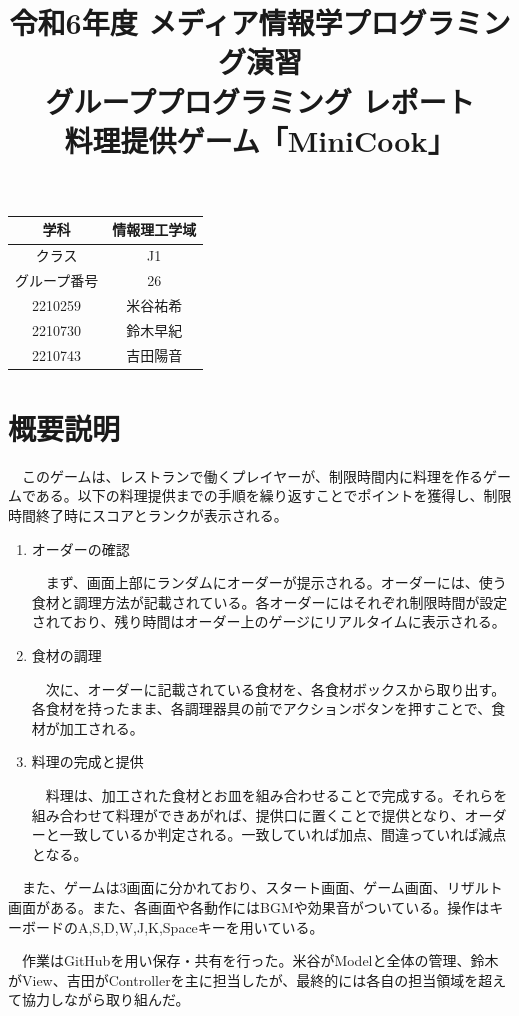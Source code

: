 \documentclass[a4j]{jarticle} %
\title{令和6年度 メディア情報学プログラミング演習\\グループプログラミング レポート\\料理提供ゲーム「MiniCook」}
\begin{document}
\maketitle

\begin{center}%
  \begin{tabular}{|c||c|}
      \hline
      学科&情報理工学域\\
      \hline
      クラス&J1\\
      \hline
      グループ番号&26\\
      \hline
      2210259&米谷祐希\\
      \hline
      2210730&鈴木早紀\\
      \hline
      2210743&吉田陽音\\
      \hline
  \end{tabular}
\end{center}

\newpage

\section{概要説明}
　このゲームは、レストランで働くプレイヤーが、制限時間内に料理を作るゲームである。以下の料理提供までの手順を繰り返すことでポイントを獲得し、制限時間終了時にスコアとランクが表示される。
\begin{enumerate}
  \item オーダーの確認\par
  　まず、画面上部にランダムにオーダーが提示される。オーダーには、使う食材と調理方法が記載されている。各オーダーにはそれぞれ制限時間が設定されており、残り時間はオーダー上のゲージにリアルタイムに表示される。
  \item 食材の調理\par
  　次に、オーダーに記載されている食材を、各食材ボックスから取り出す。各食材を持ったまま、各調理器具の前でアクションボタンを押すことで、食材が加工される。
  \item 料理の完成と提供\par
  　料理は、加工された食材とお皿を組み合わせることで完成する。それらを組み合わせて料理ができあがれば、提供口に置くことで提供となり、オーダーと一致しているか判定される。一致していれば加点、間違っていれば減点となる。   
\end{enumerate}
　また、ゲームは3画面に分かれており、スタート画面、ゲーム画面、リザルト画面がある。また、各画面や各動作にはBGMや効果音がついている。操作はキーボードのA,S,D,W,J,K,Spaceキーを用いている。\par
　作業はGitHubを用い保存・共有を行った。米谷がModelと全体の管理、鈴木がView、吉田がControllerを主に担当したが、最終的には各自の担当領域を超えて協力しながら取り組んだ。
\end{document}
